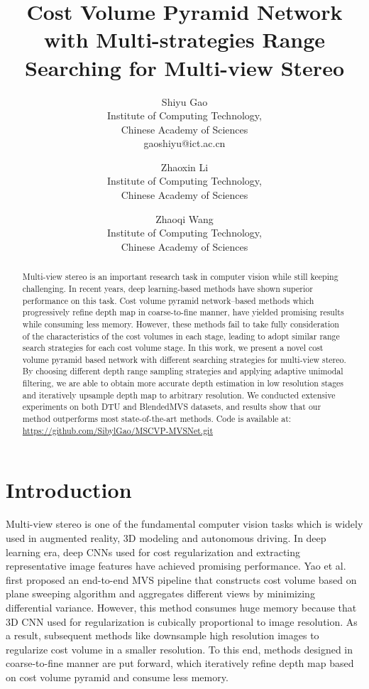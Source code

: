\documentclass{article}
\title{Cost Volume Pyramid Network with Multi-strategies Range Searching for Multi-view Stereo}
\author{ Shiyu Gao \\ Institute of Computing Technology, \\Chinese Academy of Sciences\\ gaoshiyu@ict.ac.cn \and
Zhaoxin Li  \\ Institute of Computing Technology, \\Chinese Academy of Sciences \and
Zhaoqi Wang \\Institute of Computing Technology, \\Chinese Academy of Sciences 
}
\begin{document}
\maketitle

\begin{abstract}
Multi-view stereo is an important research task in computer vision while still keeping challenging.
In recent years, deep learning-based methods have shown superior performance on this task.
Cost volume pyramid network–based methods which progressively refine depth map in coarse-to-fine manner, have yielded promising results while consuming less memory.
However, these methods fail to take fully consideration of the characteristics of the cost volumes in each stage, leading to adopt similar range search strategies for each cost volume stage.
In this work, we present a novel cost volume pyramid based network with different searching strategies for multi-view stereo.
By choosing different depth range sampling strategies and applying adaptive unimodal filtering, we are able to obtain more accurate depth estimation in low resolution stages and iteratively upsample depth map to arbitrary resolution.
We conducted extensive experiments on both DTU and BlendedMVS datasets, and results show that our method outperforms most state-of-the-art methods.
Code is available at: 
\url{https://github.com/SibylGao/MSCVP-MVSNet.git}
\end{abstract}




\section{Introduction}
Multi-view stereo is one of the fundamental computer vision tasks which is widely used in augmented reality, 3D modeling and autonomous driving. 
In deep learning era, deep CNNs used for cost regularization and extracting representative image features have achieved promising performance. Yao et al. \cite{yao2018mvsnet} first proposed an end-to-end MVS pipeline that constructs cost volume based on plane sweeping algorithm and aggregates different views by minimizing differential variance. However, this method consumes huge memory because that 3D CNN used for regularization is cubically proportional to image resolution. As a result, subsequent methods like \cite{yao2018mvsnet,yao2019recurrent} downsample high resolution images to regularize cost volume in a smaller resolution. To this end, methods designed in coarse-to-fine manner \cite{chen2019point,yu2020fast,yang2020cost,gu2020cascade} are put forward, which iteratively refine depth map based on cost volume pyramid and consume less memory. 
\end{document}
